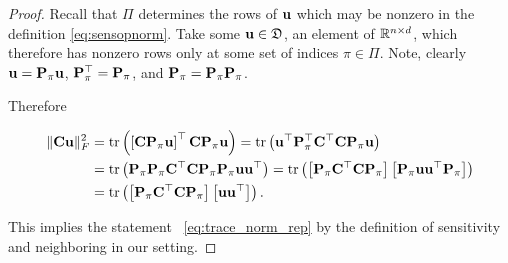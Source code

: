\documentclass{article}
\begin{document}
\begin{proof}

Recall that $\Pi$ determines the rows of $\mathbf{u}$ which may be nonzero in the definition \cref{eq:sensopnorm}. Take some $\mathbf{u} \in \mathfrak{D}$, an element of $\mathbb{R}^{n \times d}$, which therefore has nonzero rows only at some set of indices $\pi \in \Pi$.%
Note, clearly $\mathbf{u} = \mathbf{P}_\pi\mathbf{u}$, $\mathbf{P}_\pi^\top = \mathbf{P}_\pi$, and $\mathbf{P}_\pi = \mathbf{P}_\pi \mathbf{P}_\pi$.

Therefore

\begin{align}\label{eq:trace_norm_rep_derivation}
\begin{split}
    \|\mathbf{C} \mathbf{u}\|_F^2 &= \mathrm{tr}\left(\left[\mathbf{C}\mathbf{P}_\pi\mathbf{u}\right]^\top \mathbf{C}\mathbf{P}_\pi\mathbf{u}\right) = \mathrm{tr}\left(\mathbf{u}^\top \mathbf{P}_\pi^\top \mathbf{C}^\top\mathbf{C} \mathbf{P}_\pi \mathbf{u}\right)\\
    &= \mathrm{tr}\left( \mathbf{P}_\pi \mathbf{P}_\pi \mathbf{C}^\top\mathbf{C} \mathbf{P}_\pi \mathbf{P}_\pi \mathbf{u} \mathbf{u}^\top\right) = \mathrm{tr}\left( \left[\mathbf{P}_\pi \mathbf{C}^\top\mathbf{C} \mathbf{P}_\pi \right]\left[\mathbf{P}_\pi \mathbf{u} \mathbf{u}^\top \mathbf{P}_\pi \right]\right)\\
    &= \mathrm{tr}\left( \left[\mathbf{P}_\pi \mathbf{C}^\top\mathbf{C} \mathbf{P}_\pi \right]\left[\mathbf{u} \mathbf{u}^\top\right]\right).
\end{split}
\end{align}

This implies the statement ~\cref{eq:trace_norm_rep} by the definition of sensitivity and neighboring in our setting.





\end{proof}
\end{document}
